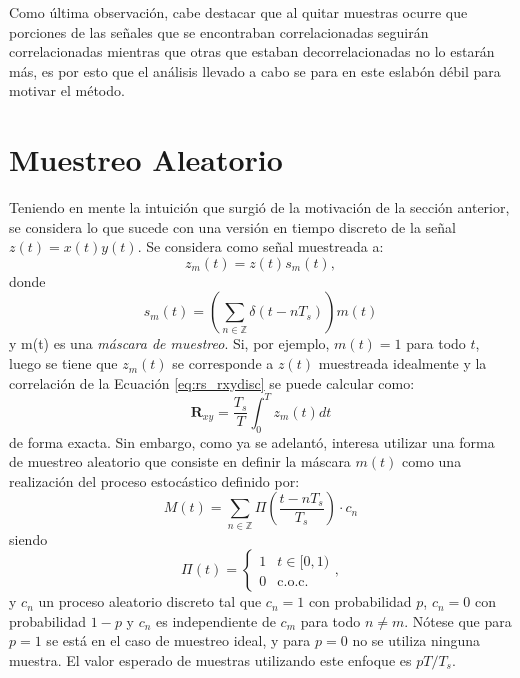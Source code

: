 Como última observación, cabe destacar que al quitar muestras ocurre que porciones de las señales que se encontraban correlacionadas seguirán correlacionadas mientras que otras que estaban decorrelacionadas no lo estarán más, es por esto que el análisis llevado a cabo se para en este eslabón débil para motivar el método.


\section{Muestreo Aleatorio}\label{subc:rs_muestreoaleatorio}

Teniendo en mente la intuición que surgió de la motivación de la sección anterior, se considera lo que sucede con una versión en tiempo discreto de la señal $z(t)=x(t)y(t)$. Se considera como señal muestreada a:
\begin{equation}
    z_m(t)=z(t)s_m(t),
\end{equation}
donde
\begin{equation}
    s_m(t)=\left( \sum_{n \in \mathbb{Z}} \delta (t-nT_s) \right) m(t)
\end{equation}
y m(t) es una \emph{máscara de muestreo}. Si, por ejemplo, $m(t)=1$ para todo $t$, luego se tiene que $z_m(t)$ se corresponde a $z(t)$ muestreada idealmente y la correlación de la Ecuación \ref{eq:rs_rxydisc} se puede calcular como:
\begin{equation}
    \mathbf{R}_{xy}=\frac{T_s}{T}\int_0^T z_m(t)dt
    \label{eq:rs_rz}
\end{equation}
de forma exacta. Sin embargo, como ya se adelantó, interesa utilizar una forma de muestreo aleatorio que consiste en definir la máscara $m(t)$ como una realización del proceso estocástico definido por:
\begin{equation}
    M(t)=\sum_{n \in \mathbb{Z}} \Pi \left( \frac{t-nT_s}{T_s} \right) \cdot c_n
\end{equation}
siendo
\begin{equation}
    \Pi(t)=\left\{\begin{matrix}
        1 & t\in [0,1)      \\
        0 & \textrm{c.o.c.}
    \end{matrix}\right.,
\end{equation}
y $c_n$ un proceso aleatorio discreto tal que $c_n=1$ con probabilidad $p$, $c_n=0$ con probabilidad $1-p$ y $c_n$ es independiente de $c_m$ para todo $n\neq m$. Nótese que para $p=1$ se está en el caso de muestreo ideal, y para $p=0$ no se utiliza ninguna muestra. El valor esperado de muestras utilizando este enfoque es $pT/T_s$.

